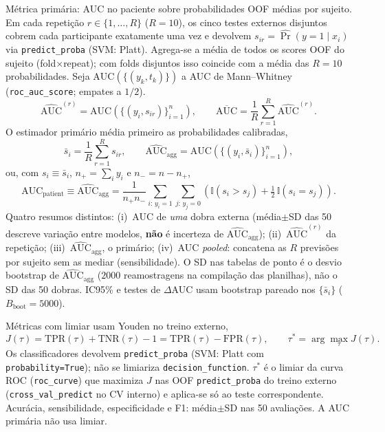 \documentclass[review]{elsarticle}
\newcommand{\code}[1]{\texttt{#1}}
\begin{document}
Métrica primária: AUC no paciente sobre probabilidades OOF médias por sujeito.
Em cada repetição $r\in\{1,\ldots,R\}$ ($R=10$), os cinco testes externos disjuntos cobrem cada participante exatamente uma vez e devolvem $s_{ir}=\widehat{\Pr}(y=1\mid x_i)$ via \code{predict\_proba} (SVM: Platt).
Agrega-se a média de todos os scores OOF do sujeito (fold$\times$repeat); com folds disjuntos isso coincide com a média das $R=10$ probabilidades.
Seja $\mathrm{AUC}(\{(y_k,t_k)\})$ a AUC de Mann--Whitney (\code{roc\_auc\_score}; empates a $1/2$).
\begin{equation}
\widehat{\mathrm{AUC}}^{(r)}
=
\mathrm{AUC}\!\left(\{(y_i,s_{ir})\}_{i=1}^{n}\right),
\qquad
\overline{\mathrm{AUC}}
=
\frac{1}{R}\sum_{r=1}^{R}\widehat{\mathrm{AUC}}^{(r)}.
\label{eq:auc-mean-rep}
\end{equation}
O estimador primário média primeiro as probabilidades calibradas,
\begin{equation}
\bar{s}_i
=
\frac{1}{R}\sum_{r=1}^{R}s_{ir},
\qquad
\widehat{\mathrm{AUC}}_{\mathrm{agg}}
=
\mathrm{AUC}\!\left(\{(y_i,\bar{s}_i)\}_{i=1}^{n}\right),
\label{eq:auc-agg}
\end{equation}
ou, com $s_i\equiv\bar{s}_i$, $n_+=\sum_i y_i$ e $n_-=n-n_+$,
\begin{equation}
\mathrm{AUC}_{\mathrm{patient}}
\equiv
\widehat{\mathrm{AUC}}_{\mathrm{agg}}
= \frac{1}{n_+ n_-}
\sum_{i:\,y_i=1} \sum_{j:\,y_j=0}
\left(
\mathbb{I}(s_i > s_j)
+ \tfrac{1}{2}\,\mathbb{I}(s_i = s_j)
\right).
\label{eq:auc-pooled}
\end{equation}
Quatro resumos distintos: (i)~AUC de \emph{uma} dobra externa (média$\pm$SD das 50 descreve variação entre modelos, \textbf{não} é incerteza de $\widehat{\mathrm{AUC}}_{\mathrm{agg}}$);
(ii)~$\widehat{\mathrm{AUC}}^{(r)}$ da repetição;
(iii)~$\widehat{\mathrm{AUC}}_{\mathrm{agg}}$, o primário;
(iv)~AUC \emph{pooled}: concatena as $R$ previsões por sujeito sem as mediar (sensibilidade).
O SD nas tabelas de ponto é o desvio bootstrap de $\widehat{\mathrm{AUC}}_{\mathrm{agg}}$ ($2000$ reamostragens na compilação das planilhas), não o SD das 50 dobras.
IC95\% e testes de $\Delta$AUC usam bootstrap pareado nos $\{\bar{s}_i\}$ ($B_{\mathrm{boot}}=5000$).

Métricas com limiar usam Youden no treino externo,
\begin{equation}
J(\tau) = \mathrm{TPR}(\tau) + \mathrm{TNR}(\tau) - 1
= \mathrm{TPR}(\tau)-\mathrm{FPR}(\tau),
\qquad
\tau^{*} = \arg\max_{\tau} J(\tau).
\label{eq:youden}
\end{equation}
Os classificadores devolvem \code{predict\_proba} (SVM: Platt com \code{probability=True}); não se limiariza \code{decision\_function}.
$\tau^{*}$ é o limiar da curva ROC (\code{roc\_curve}) que maximiza $J$ nas OOF \code{predict\_proba} do treino externo (\code{cross\_val\_predict} no CV interno) e aplica-se só ao teste correspondente.
Acurácia, sensibilidade, especificidade e F1: média$\pm$SD nas 50 avaliações.
A AUC primária não usa limiar.
\end{document}
